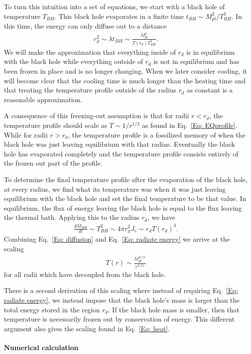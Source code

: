 \documentclass[superscriptaddress,groupedaddress,nofootnoteinbib,11pt]{article}
\newcommand\eea{\end{eqnarray}}
\newcommand\bea{\begin{eqnarray}}
\newcommand{\mpl}{M_{pl}}
\begin{document}
To turn this intuition into a set of equations, we start with a black hole of temperature $T_{BH}$.  This black hole evaporates in a finite time $t_{BH} \sim \mpl^2/T_{BH}^3$.  In this time, the energy can only diffuse out to a distance
\bea
\label{Eq: diffusion}
r_d^2 \sim \lambda t_{BH} \sim \frac{\mpl^2}{T(r_d) T_{BH}^3}.
\eea
We will make the approximation that everything inside of $r_d$ is in equilibrium with the black hole while everything outside of $r_d$ is not in equilibrium and has been frozen in place and is no longer changing.  
When we later consider cooling, it will become clear that the cooling time is much longer than the heating time and that treating the temperature profile outside of the radius $r_d$ as constant is a reasonable approximation.

A consequence of this freezing-out assumption is that for radii $r < r_d$, the temperature profile should scale as $T \sim 1/r^{1/3}$ as found in Eq.~\ref{Eq: EQprofile}.  While for radii $r > r_d$, the temperature profile is a fossilized memory of when the black hole was just leaving equilibrium with that radius.  Eventually the black hole has evaporated completely and the temperature profile consists entirely of the frozen out part of the profile.

To determine the final temperature profile after the evaporation of the black hole, at every radius, we find what its temperature was when it was just leaving equilibrium with the black hole and set the final temperature to be that value.
In equilibrium, the flux of energy leaving the black hole is equal to the flux leaving the thermal bath.  Applying this to the radius $r_d$, we have
\bea
\label{Eq: radiate energy}
\frac{d M_{BH}}{dt} \sim T_{BH}^2 \sim 4 \pi r_d^2 J_r \sim r_d T(r_d)^3.
\eea
Combining Eq.~\ref{Eq: diffusion} and Eq.~\ref{Eq: radiate energy} we arrive at the scaling
\bea
\label{Eq: heat}
T(r) \sim \frac{\mpl^{4/11}}{r^{7/11}}
\eea
for all radii which have decoupled from the black hole.



There is a second derivation of this scaling where instead of requiring Eq.~\ref{Eq: radiate energy}, we instead impose that the black hole's mass is larger than the total energy stored in the region $r_d$.  If the black hole mass is smaller, then that temperature is necessarily frozen out by conservation of energy.  This different argument also gives the scaling found in Eq.~\ref{Eq: heat}.



\paragraph{Numerical calculation}
\end{document}
